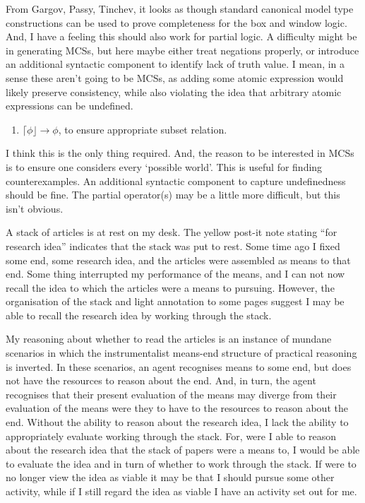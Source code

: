 \documentclass[10pt]{article}
\newcommand{\lattn}{\ensuremath{\lceil}}
\newcommand{\rattn}{\ensuremath{\rfloor}}
\newcommand{\attn}[1]{\ensuremath{\mathord{\lattn{#1}\rattn}}}
\begin{document}
From Gargov, Passy, Tinchev, it looks as though standard canonical model type constructions can be used to prove completeness for the box and window logic.
And, I have a feeling this should also work for partial logic.
A difficulty might be in generating MCSs, but here maybe either treat negations properly, or introduce an additional syntactic component to identify lack of truth value.
I mean, in a sense these aren't going to be MCSs, as adding some atomic expression would likely preserve consistency, while also violating the idea that arbitrary atomic expressions can be undefined.

\begin{enumerate}
\item \(\attn{\phi} \rightarrow \phi\), to ensure appropriate subset relation.
\end{enumerate}

I think this is the only thing required.
And, the reason to be interested in MCSs is to ensure one considers every `possible world'.
This is useful for finding counterexamples.
An additional syntactic component to capture undefinedness should be fine.
The partial operator(s) may be a little more difficult, but this isn't obvious.



\newpage

A stack of articles is at rest on my desk.
The yellow post-it note stating ``for research idea'' indicates that the stack was put to rest.
Some time ago I fixed some end, some research idea, and the articles were assembled as means to that end.
Some thing interrupted my performance of the means, and I can not now recall the idea to which the articles were a means to pursuing.
However, the organisation of the stack and light annotation to some pages suggest I may be able to recall the research idea by working through the stack.

My reasoning about whether to read the articles is an instance of mundane scenarios in which the instrumentalist means-end structure of practical reasoning is inverted.
In these scenarios, an agent recognises means to some end, but does not have the resources to reason about the end.
And, in turn, the agent recognises that their present evaluation of the means may diverge from their evaluation of the means were they to have to the resources to reason about the end.
Without the ability to reason about the research idea, I lack the ability to appropriately evaluate working through the stack.
For, were I able to reason about the research idea that the stack of papers were a means to, I would be able to evaluate the idea and in turn of whether to work through the stack.
If were to no longer view the idea as viable it may be that I should pursue some other activity, while if I still regard the idea as viable I have an activity set out for me.
\end{document}
